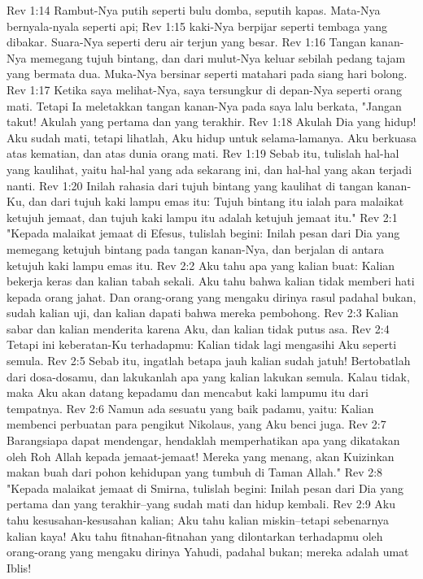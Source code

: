 Rev 1:14  Rambut-Nya putih seperti bulu domba, seputih kapas. Mata-Nya bernyala-nyala seperti api;
Rev 1:15  kaki-Nya berpijar seperti tembaga yang dibakar. Suara-Nya seperti deru air terjun yang besar.
Rev 1:16  Tangan kanan-Nya memegang tujuh bintang, dan dari mulut-Nya keluar sebilah pedang tajam yang bermata dua. Muka-Nya bersinar seperti matahari pada siang hari bolong.
Rev 1:17  Ketika saya melihat-Nya, saya tersungkur di depan-Nya seperti orang mati. Tetapi Ia meletakkan tangan kanan-Nya pada saya lalu berkata, "Jangan takut! Akulah yang pertama dan yang terakhir.
Rev 1:18  Akulah Dia yang hidup! Aku sudah mati, tetapi lihatlah, Aku hidup untuk selama-lamanya. Aku berkuasa atas kematian, dan atas dunia orang mati.
Rev 1:19  Sebab itu, tulislah hal-hal yang kaulihat, yaitu hal-hal yang ada sekarang ini, dan hal-hal yang akan terjadi nanti.
Rev 1:20  Inilah rahasia dari tujuh bintang yang kaulihat di tangan kanan-Ku, dan dari tujuh kaki lampu emas itu: Tujuh bintang itu ialah para malaikat ketujuh jemaat, dan tujuh kaki lampu itu adalah ketujuh jemaat itu."
Rev 2:1  "Kepada malaikat jemaat di Efesus, tulislah begini: Inilah pesan dari Dia yang memegang ketujuh bintang pada tangan kanan-Nya, dan berjalan di antara ketujuh kaki lampu emas itu.
Rev 2:2  Aku tahu apa yang kalian buat: Kalian bekerja keras dan kalian tabah sekali. Aku tahu bahwa kalian tidak memberi hati kepada orang jahat. Dan orang-orang yang mengaku dirinya rasul padahal bukan, sudah kalian uji, dan kalian dapati bahwa mereka pembohong.
Rev 2:3  Kalian sabar dan kalian menderita karena Aku, dan kalian tidak putus asa.
Rev 2:4  Tetapi ini keberatan-Ku terhadapmu: Kalian tidak lagi mengasihi Aku seperti semula.
Rev 2:5  Sebab itu, ingatlah betapa jauh kalian sudah jatuh! Bertobatlah dari dosa-dosamu, dan lakukanlah apa yang kalian lakukan semula. Kalau tidak, maka Aku akan datang kepadamu dan mencabut kaki lampumu itu dari tempatnya.
Rev 2:6  Namun ada sesuatu yang baik padamu, yaitu: Kalian membenci perbuatan para pengikut Nikolaus, yang Aku benci juga.
Rev 2:7  Barangsiapa dapat mendengar, hendaklah memperhatikan apa yang dikatakan oleh Roh Allah kepada jemaat-jemaat! Mereka yang menang, akan Kuizinkan makan buah dari pohon kehidupan yang tumbuh di Taman Allah."
Rev 2:8  "Kepada malaikat jemaat di Smirna, tulislah begini: Inilah pesan dari Dia yang pertama dan yang terakhir--yang sudah mati dan hidup kembali.
Rev 2:9  Aku tahu kesusahan-kesusahan kalian; Aku tahu kalian miskin--tetapi sebenarnya kalian kaya! Aku tahu fitnahan-fitnahan yang dilontarkan terhadapmu oleh orang-orang yang mengaku dirinya Yahudi, padahal bukan; mereka adalah umat Iblis!
